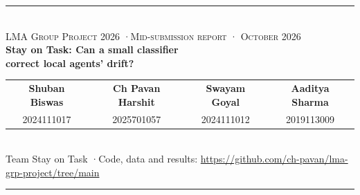 \documentclass[10.5pt,a4paper]{article}
\begin{document}
\thispagestyle{plain}
\begin{center}
{\color{rule}\rule{\linewidth}{1.4pt}}\\[6pt]
{\small\color{sub}\textsc{LMA Group Project 2026 \enspace·\enspace Mid-submission report \enspace· October 2026}}\\[8pt]
{\LARGE\bfseries\color{head} Stay on Task: Can a small classifier\\[2pt] correct local agents' drift?}\\[11pt]
\begin{tabular}{cccc}
\textbf{Shuban Biswas} & \textbf{Ch Pavan Harshit} & \textbf{Swayam Goyal} & \textbf{Aaditya Sharma}\\
{\small 2024111017} & {\small 2025701057} & {\small 2024111012} & {\small 2019113009}
\end{tabular}\\[7pt]
{\small Team Stay on Task \enspace·\enspace Code, data and results: \url{https://github.com/ch-pavan/lma-grp-project/tree/main}}\\[4pt]
{\color{rule}\rule{\linewidth}{0.6pt}}
\end{center}
\end{document}
